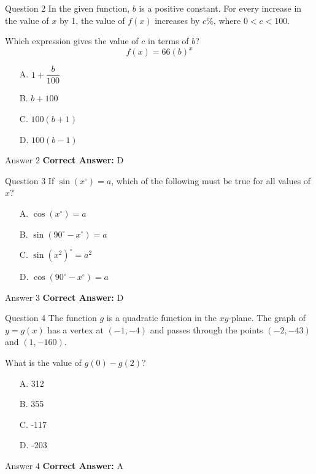 \documentclass{beamer}
\begin{document}
\begin{frame}{Question 2}
\small
In the given function, \(b\) is a positive constant. For every increase in the value of \(x\) by 1, the value of \(f(x)\) increases by \(c\%\), where \(0 < c < 100\).

Which expression gives the value of \(c\) in terms of \(b\)?
\[
f(x) = 66(b)^x
\]
\vspace{0.35cm}
\begin{enumerate}
    \item[A.] \(1 + \dfrac{b}{100}\)
    \item[B.] \(b + 100\)
    \item[C.] \(100(b + 1)\)
    \item[D.] \(100(b - 1)\)
\end{enumerate}
\end{frame}
\begin{frame}{Answer 2}
\small
\textbf{Correct Answer:} D
\end{frame}

\begin{frame}{Question 3}
\small
If \(\sin(x^\circ) = a\), which of the following must be true for all values of \(x\)?
\vspace{0.35cm}
\begin{enumerate}
    \item[A.] \(\cos(x^\circ) = a\)
    \item[B.] \(\sin(90^\circ - x^\circ) = a\)
    \item[C.] \(\sin(x^2)^\circ = a^2\)
    \item[D.] \(\cos(90^\circ - x^\circ) = a\)
\end{enumerate}
\end{frame}
\begin{frame}{Answer 3}
\small
\textbf{Correct Answer:} D
\end{frame}

\begin{frame}{Question 4}
\small
The function \(g\) is a quadratic function in the \(xy\)-plane. The graph of \(y = g(x)\) has a vertex at \((-1, -4)\) and passes through the points \((-2, -43)\) and \((1, -160)\).

What is the value of \(g(0) - g(2)\)?
\vspace{0.35cm}
\begin{enumerate}
    \item[A.] 312
    \item[B.] 355
    \item[C.] -117
    \item[D.] -203
\end{enumerate}
\end{frame}
\begin{frame}{Answer 4}
\small
\textbf{Correct Answer:} A
\end{frame}
\end{document}

